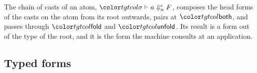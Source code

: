 The chain of casts of an atom, $\chn{\sigma}{a}{n}{F}$, composes the head forms of the casts on the atom from its root outwards, pairs at $\ev{both}$, and passes through $\ev{fold}$ and $\ev{unfold}$. Its result is a form out of the type of the root, and it is the form the machine consults at an application.

\subsection{Typed forms}

\begin{figure}
\small
\color{tgtcol}
\end{figure}
